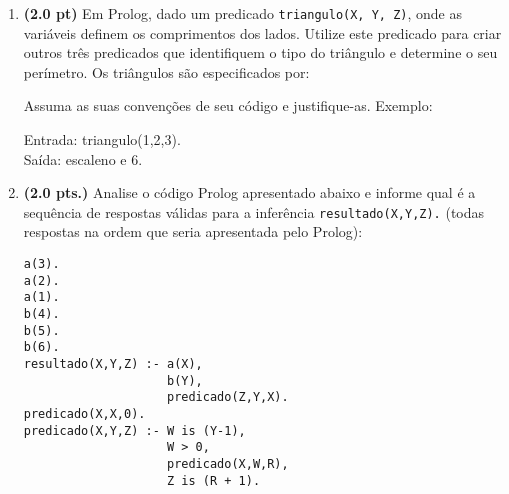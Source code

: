 \documentclass[a4paper,11pt]{article}
\begin{document}
\begin{enumerate}
\item {\bf (2.0 pt)} Em Prolog, dado um predicado {\tt triangulo(X, Y, Z)}, onde as variáveis definem os comprimentos dos lados. Utilize este predicado para criar outros três predicados que identifiquem
o tipo do triângulo e determine 
o seu perímetro. Os triângulos são especificados por:

Assuma as suas convenções de seu código e justifique-as.
Exemplo:
\begin{center}
Entrada: triangulo(1,2,3).\\
Saída:  escaleno e 6.
\end{center}

\item {\bf (2.0 pts.)} Analise o código Prolog apresentado abaixo e informe qual é  a sequência de respostas válidas para a inferência {\tt resultado(X,Y,Z).} 
{\small (todas respostas na ordem que seria apresentada pelo Prolog)}:

\begin{verbatim}
a(3).
a(2).
a(1).
b(4).
b(5).
b(6).
resultado(X,Y,Z) :- a(X), 
                    b(Y), 
                    predicado(Z,Y,X).
predicado(X,X,0).
predicado(X,Y,Z) :- W is (Y-1), 
                    W > 0,  
                    predicado(X,W,R), 
                    Z is (R + 1).
\end{verbatim}
\end{enumerate}
\end{document}
